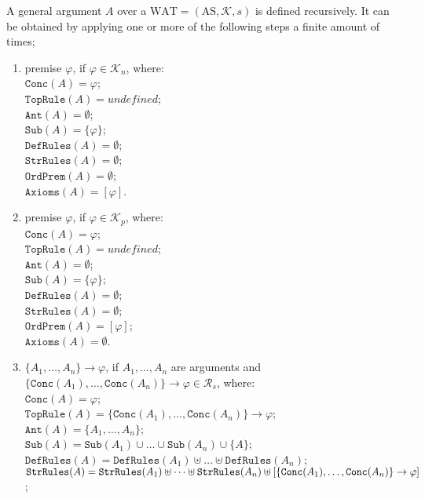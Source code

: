 \documentclass[runningheads]{llncs}
\newcommand{\Rs}{\mathcal{R}_s}
\newcommand{\K}{\mathcal{K}}
\newcommand{\Kn}{\mathcal{K}_n}
\newcommand{\Kp}{\mathcal{K}_p}
\newcommand{\Ord}{\texttt{OrdPrem}}
\newcommand{\Ax}{\texttt{Axioms}}
\newcommand{\Conc}{\texttt{Conc}}
\newcommand{\DefRules}{\texttt{DefRules}}
\newcommand{\StrRules}{\texttt{StrRules}}
\newcommand{\TopRule}{\texttt{TopRule}}
\newcommand{\Ant}{\texttt{Ant}}
\newcommand{\Sub}{\texttt{Sub}}
\begin{document}
\begin{definition}\label{Argument}
A general argument  $A$ over a $\text{WAT} = ( \text{AS}, \K, s )$ is defined recursively. It can be obtained by applying one or more of the following steps a finite amount of times;
\begin{enumerate}
    \item premise $\varphi$, if $\varphi \in \Kn$, where:\\
    $\Conc(A) = \varphi$;\\
    $\TopRule(A) = undefined$;\\
    $\Ant(A) = \emptyset$;\\
    $\Sub(A) = \{\varphi\}$;\\
    $\DefRules(A) = \emptyset$;\\
    $\StrRules(A) = \emptyset$;\\
    $\Ord(A) = \emptyset$;\\
    $\Ax(A) = [\varphi]$.
    \item premise $\varphi$, if $\varphi \in \Kp$, where:\\
    $\Conc(A) = \varphi$;\\
    $\TopRule(A) = undefined$;\\
    $\Ant(A) = \emptyset$;\\
    $\Sub(A) = \{\varphi\}$;\\
    $\DefRules(A) = \emptyset$;\\
    $\StrRules(A) = \emptyset$;\\
    $\Ord(A) = [\varphi]$;\\
    $\Ax(A) = \emptyset$.
    \item $\{A_1, \dots, A_n\} \rightarrow \varphi$, if $A_1, \dots, A_n$ are arguments and \\$\{\Conc(A_1), \dots, \Conc(A_n)\} \rightarrow \varphi \in \Rs$, where:\\
    $\Conc(A) = \varphi$;\\
    $\TopRule(A) = \{\Conc(A_1), \dots, \Conc(A_n)\} \rightarrow \varphi$;\\
    $\Ant(A) = \{ A_1, \dots, A_n \}$;\\
    $\Sub(A) = \Sub(A_1) \cup \dots \cup \Sub(A_n) \cup \{A\}$;\\
    $\DefRules(A) = \DefRules(A_1) \uplus \dots \uplus \DefRules(A_n)$;\\
    $\StrRules(A) \\= \StrRules(A_1) \uplus \dots \uplus \StrRules(A_n) \uplus [\{\Conc(A_1), \dots, \Conc(A_n)\} \rightarrow \varphi]$;\\

\end{enumerate}
\end{definition}
\end{document}
